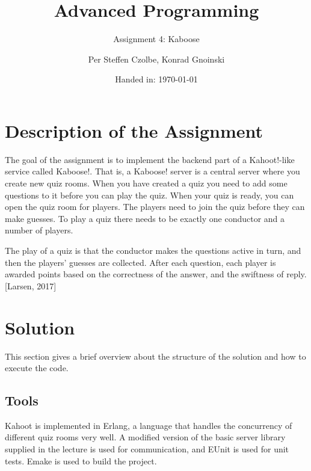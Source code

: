 \documentclass[11pt, a4paper]{article}
\author{Per Steffen Czolbe, Konrad Gnoinski}
\title{Advanced Programming}
\subtitle{Assignment 4: Kaboose} %
\date{Handed in: \today}
\begin{document}
\maketitle

\tableofcontents


\section{Description of the Assignment}
The goal of the assignment is to implement the backend part of a Kahoot!-like service called Kaboose!. That is, a Kaboose! server is a central server where you create new quiz rooms. When you have created a quiz you need to add some questions to it before you can play the quiz. When your quiz is ready, you can open the quiz room for players. The players need to join the quiz before they can make guesses. To play a quiz there needs to be exactly one conductor and a number of players.

The play of a quiz is that the conductor makes the questions active in turn, and then the players’ guesses are collected. After each question, each player is awarded points based on the correctness of the answer, and the swiftness of reply. [Larsen, 2017]

\pagebreak
\section{Solution}
This section gives a brief overview about the structure of the solution and how to execute the code.

\subsection{Tools}
Kahoot is implemented in Erlang, a language that handles the concurrency of different quiz rooms very well. A modified version of the basic server library supplied in the lecture is used for communication, and EUnit is used for unit tests. Emake is used to build the project.
\end{document}
